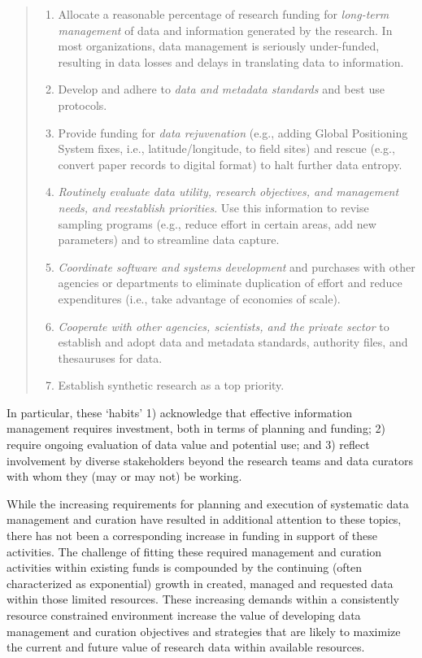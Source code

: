 \documentclass[paper]{ijdc-v9}
\begin{document}
\begin{quote}
\begin{enumerate}
\def\labelenumi{\arabic{enumi}.}
\item
  Allocate a reasonable percentage of research funding for
  \emph{long-term management} of data and information generated by the
  research. In most organizations, data management is seriously
  under-funded, resulting in data losses and delays in translating data
  to information.
\item
  Develop and adhere to \emph{data and metadata standards} and best use
  protocols.
\item
  Provide funding for \emph{data rejuvenation} (e.g., adding Global
  Positioning System fixes, i.e., latitude/longitude, to field sites)
  and rescue (e.g., convert paper records to digital format) to halt
  further data entropy.
\item
  \emph{Routinely evaluate data utility, research objectives, and
  management needs, and reestablish priorities}. Use this information to
  revise sampling programs (e.g., reduce effort in certain areas, add
  new parameters) and to streamline data capture.
\item
  \emph{Coordinate software and systems development} and purchases with
  other agencies or departments to eliminate duplication of effort and
  reduce expenditures (i.e., take advantage of economies of scale).
\item
  \emph{Cooperate with other agencies, scientists, and the private
  sector} to establish and adopt data and metadata standards, authority
  files, and thesauruses for data.
\item
  Establish synthetic research as a top priority. \autocite[pp 434.
  Emphasis added.]{michener_role_1999}
\end{enumerate}
\end{quote}

In particular, these `habits' 1) acknowledge that effective information
management requires investment, both in terms of planning and funding;
2) require ongoing evaluation of data value and potential use; and 3)
reflect involvement by diverse stakeholders beyond the research teams
and data curators with whom they (may or may not) be working.

While the increasing requirements for planning and execution of
systematic data management and curation have resulted in additional
attention to these topics, there has not been a corresponding increase
in funding in support of these activities. The challenge of fitting
these required management and curation activities within existing funds
is compounded by the continuing (often characterized as exponential)
growth
\autocites{turner_executive_2016}{national_aeronautics_and_space_administration_nasa_heasarc_2016}
in created, managed and requested data within those limited resources.
These increasing demands within a consistently resource constrained
environment increase the value of developing data management and
curation objectives and strategies that are likely to maximize the
current and future value of research data within available resources.
\end{document}
